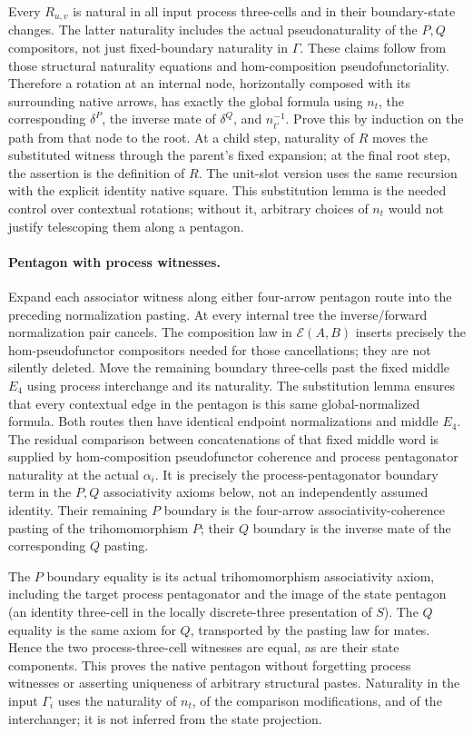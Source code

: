 \documentclass{article}
\begin{document}
Every $R_{u,v}$ is natural in all input process three-cells and in their boundary-state changes. The latter naturality includes the actual pseudonaturality of the $P,Q$ compositors, not just fixed-boundary naturality in $\Gamma$. These claims follow from those structural naturality equations and hom-composition pseudofunctoriality. Therefore a rotation at an internal node, horizontally composed with its surrounding native arrows, has exactly the global formula using $n_t$, the corresponding $\delta^P$, the inverse mate of $\delta^Q$, and $n_{t'}^{-1}$. Prove this by induction on the path from that node to the root. At a child step, naturality of $R$ moves the substituted witness through the parent's fixed expansion; at the final root step, the assertion is the definition of $R$. The unit-slot version uses the same recursion with the explicit identity native square. This substitution lemma is the needed control over contextual rotations; without it, arbitrary choices of $n_t$ would not justify telescoping them along a pentagon.

\paragraph{Pentagon with process witnesses.} Expand each associator witness along either four-arrow pentagon route into the preceding normalization pasting. At every internal tree the inverse/forward normalization pair cancels. The composition law in $\mathcal E(A,B)$ inserts precisely the hom-pseudofunctor compositors needed for those cancellations; they are not silently deleted. Move the remaining boundary three-cells past the fixed middle $E_4$ using process interchange and its naturality. The substitution lemma ensures that every contextual edge in the pentagon is this same global-normalized formula. Both routes then have identical endpoint normalizations and middle $E_4$. The residual comparison between concatenations of that fixed middle word is supplied by hom-composition pseudofunctor coherence and process pentagonator naturality at the actual $\alpha_i$. It is precisely the process-pentagonator boundary term in the $P,Q$ associativity axioms below, not an independently assumed identity. Their remaining $P$ boundary is the four-arrow associativity-coherence pasting of the trihomomorphism $P$; their $Q$ boundary is the inverse mate of the corresponding $Q$ pasting.

The $P$ boundary equality is its actual trihomomorphism associativity axiom, including the target process pentagonator and the image of the state pentagon (an identity three-cell in the locally discrete-three presentation of $S$). The $Q$ equality is the same axiom for $Q$, transported by the pasting law for mates. Hence the two process-three-cell witnesses are equal, as are their state components. This proves the native pentagon without forgetting process witnesses or asserting uniqueness of arbitrary structural pastes. Naturality in the input $\Gamma_i$ uses the naturality of $n_t$, of the comparison modifications, and of the interchanger; it is not inferred from the state projection.
\end{document}
